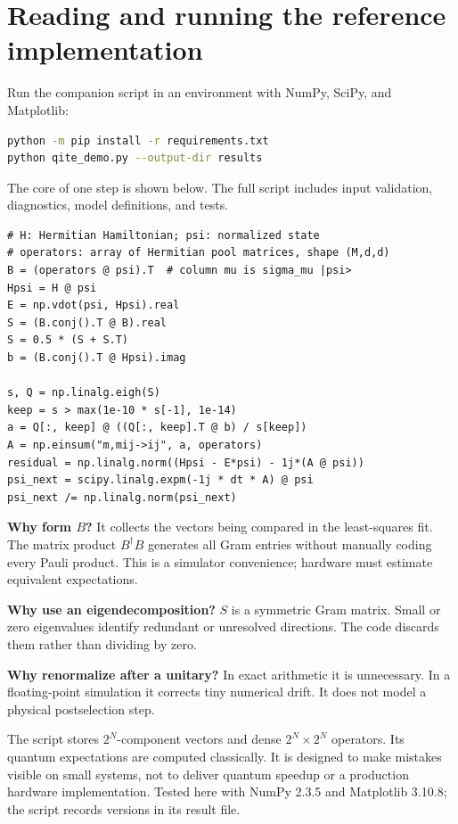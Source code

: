 \documentclass[11pt,a4paper]{article}
\newcommand{\lesson}[2]{\clearpage\section{#1}\label{#2}}
\begin{document}
\lesson{Reading and running the reference implementation}{sec:code}
Run the companion script in an environment with NumPy, SciPy, and Matplotlib:
\begin{lstlisting}[language=bash]
python -m pip install -r requirements.txt
python qite_demo.py --output-dir results
\end{lstlisting}
The core of one step is shown below. The full script includes input validation, diagnostics, model definitions, and tests.
\begin{lstlisting}
# H: Hermitian Hamiltonian; psi: normalized state
# operators: array of Hermitian pool matrices, shape (M,d,d)
B = (operators @ psi).T  # column mu is sigma_mu |psi>
Hpsi = H @ psi
E = np.vdot(psi, Hpsi).real
S = (B.conj().T @ B).real
S = 0.5 * (S + S.T)
b = (B.conj().T @ Hpsi).imag

s, Q = np.linalg.eigh(S)
keep = s > max(1e-10 * s[-1], 1e-14)
a = Q[:, keep] @ ((Q[:, keep].T @ b) / s[keep])
A = np.einsum("m,mij->ij", a, operators)
residual = np.linalg.norm((Hpsi - E*psi) - 1j*(A @ psi))
psi_next = scipy.linalg.expm(-1j * dt * A) @ psi
psi_next /= np.linalg.norm(psi_next)
\end{lstlisting}

\textbf{Why form $B$?} It collects the vectors being compared in the least-squares fit. The matrix product $B^\dagger B$ generates all Gram entries without manually coding every Pauli product. This is a simulator convenience; hardware must estimate equivalent expectations.

\textbf{Why use an eigendecomposition?} $S$ is a symmetric Gram matrix. Small or zero eigenvalues identify redundant or unresolved directions. The code discards them rather than dividing by zero.

\textbf{Why renormalize after a unitary?} In exact arithmetic it is unnecessary. In a floating-point simulation it corrects tiny numerical drift. It does not model a physical postselection step.

\begin{caution}
The script stores $2^N$-component vectors and dense $2^N\times2^N$ operators. Its quantum expectations are computed classically. It is designed to make mistakes visible on small systems, not to deliver quantum speedup or a production hardware implementation. Tested here with NumPy 2.3.5 and Matplotlib 3.10.8; the script records versions in its result file.
\end{caution}
\end{document}
